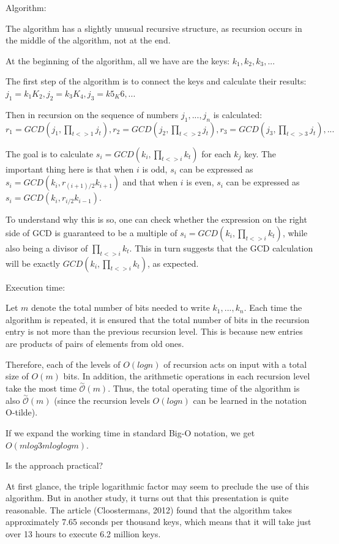 \documentclass[graybox]{svmult}
\begin{document}
Algorithm:

The algorithm has a slightly unusual recursive structure, as recursion occurs in the middle of the algorithm, not at the end.

At the beginning of the algorithm, all we have are the keys: $k_1, k_2, k_3, ...$

The first step of the algorithm is to connect the keys and calculate their results: $j_1=k_1K_2, j_2=k_3K_4, j_3=k5_K6, ...$

Then in recursion on the sequence of numbers $j_1, ..., j_n$ is calculated: $r_1 = GCD(j_1,\prod_{t<>1}j_t), r_2 = GCD(j_2,\prod_{t<>2}j_t), r_3 = GCD(j_3,\prod_{t<>3}j_t), ...$

The goal is to calculate $s_i = GCD (k_i, \prod_{t<>i} k_t)$ for each $k_j$ key. The important thing here is that when $i$ is odd, $s_i$ can be expressed as $s_i = GCD (k_i, r_{(i + 1)/2} k_{i+1})$ and that when $i$ is even, $s_i$ can be expressed as $s_i = GCD (k_i, r_{i/2} k_{i-1})$. 

To understand why this is so, one can check whether the expression on the right side of GCD is guaranteed to be a multiple of $s_i = GCD (k_i, \prod_{t<>i} k_t)$, while also being a divisor of $\prod_{t<>i} k_t$. This in turn suggests that the GCD calculation will be exactly $GCD(k_i, \prod_{t<>i} k_t)$, as expected.

Execution time:

Let $m$ denote the total number of bits needed to write $k_1, ..., k_n$. Each time the algorithm is repeated, it is ensured that the total number of bits in the recursion entry is not more than the previous recursion level. This is because new entries are products of pairs of elements from old ones.

Therefore, each of the levels of $O (log n)$ of recursion acts on input with a total size of $O (m)$ bits. In addition, the arithmetic operations in each recursion level take the most time $\overset{\sim}{\mathcal{O}} (m)$. Thus, the total operating time of the algorithm is also $\overset{\sim}{\mathcal{O}} (m)$ (since the recursion levels $O (log n)$ can be learned in the notation O-tilde).

If we expand the working time in standard Big-O notation, we get $O (m log3 m log log m)$. 

Is the approach practical?

At first glance, the triple logarithmic factor may seem to preclude the use of this algorithm. But in another study, it turns out that this presentation is quite reasonable. The article (Cloostermans, 2012) found that the algorithm takes approximately 7.65 seconds per thousand keys, which means that it will take just over 13 hours to execute 6.2 million keys.
\end{document}
